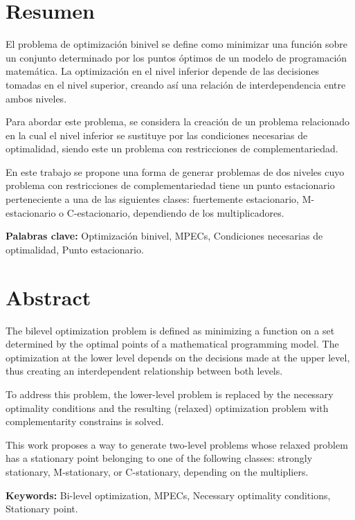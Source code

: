 \chapter*{Resumen}

El problema de optimización binivel se define como minimizar una función sobre un conjunto determinado por los puntos óptimos de un modelo de programación matemática. La optimización en el nivel inferior depende de las decisiones tomadas en el nivel superior, creando así una relación de interdependencia entre ambos niveles.

Para abordar este problema, se considera la creación de un problema relacionado en la cual el nivel inferior se sustituye por las condiciones necesarias de optimalidad, siendo este un problema con restricciones de complementariedad.

En este trabajo se propone una forma de generar problemas de dos niveles cuyo problema con restricciones de complementariedad tiene un punto estacionario perteneciente a una de las siguientes 
clases: fuertemente estacionario, M-estacionario o C-estacionario, dependiendo de los multiplicadores.


\textbf{Palabras clave:} Optimización binivel, MPECs, Condiciones necesarias de optimalidad, Punto estacionario.

\chapter*{Abstract}
The bilevel optimization problem is defined as minimizing a function on a set determined by the optimal points of a mathematical programming model. The optimization at the lower level depends on the decisions made at the upper level, thus creating an interdependent relationship between both levels.

To address this problem, the lower-level problem is replaced by the necessary optimality conditions and the resulting (relaxed) optimization problem with complementarity constrains is solved.

This work proposes a way to generate two-level problems whose relaxed problem has a stationary point belonging to one of the following classes: strongly stationary, M-stationary, or C-stationary, depending on the multipliers.

\textbf{Keywords:} Bi-level optimization, MPECs, Necessary optimality conditions, Stationary point.
